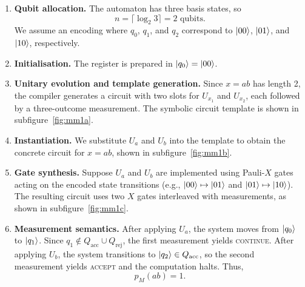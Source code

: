 \begin{enumerate}
  \item \textbf{Qubit allocation.} The automaton has three basis states, so
  \[
  n = \lceil \log_2 3 \rceil = 2 \text{ qubits}.
  \]
  We assume an encoding where $q_0$, $q_1$, and $q_2$ correspond to $\ket{00}$, $\ket{01}$, and $\ket{10}$, respectively.

  \item \textbf{Initialisation.} The register is prepared in $\ket{q_0} = \ket{00}$.

  \item \textbf{Unitary evolution and template generation.} Since $x = ab$ has length 2, the compiler generates a circuit with two slots for $U_{x_1}$ and $U_{x_2}$, each followed by a three-outcome measurement. The symbolic circuit template is shown in subfigure~\ref{fig:mm1a}.

  \item \textbf{Instantiation.} We substitute $U_a$ and $U_b$ into the template to obtain the concrete circuit for $x = ab$, shown in subfigure~\ref{fig:mm1b}.

  \item \textbf{Gate synthesis.} Suppose $U_a$ and $U_b$ are implemented using Pauli-$X$ gates acting on the encoded state transitions (e.g., $\ket{00} \mapsto \ket{01}$ and $\ket{01} \mapsto \ket{10}$). The resulting circuit uses two $X$ gates interleaved with measurements, as shown in subfigure~\ref{fig:mm1c}.

  \item \textbf{Measurement semantics.} After applying $U_a$, the system moves from $\ket{q_0}$ to $\ket{q_1}$. Since $q_1 \notin Q_{\text{acc}} \cup Q_{\text{rej}}$, the first measurement yields \textsc{continue}. After applying $U_b$, the system transitions to $\ket{q_2} \in Q_{\text{acc}}$, so the second measurement yields \textsc{accept} and the computation halts. Thus,
  \[
  p_M(ab) = 1.
  \]
\end{enumerate}

